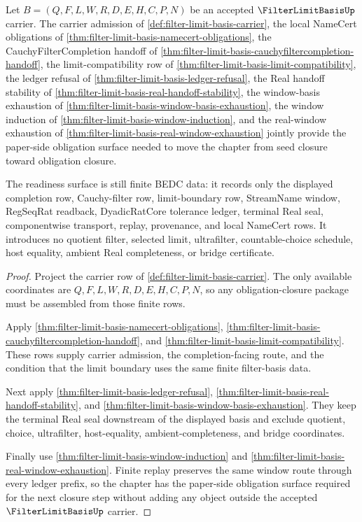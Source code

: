 \begin{theorem}
\label{thm:filter-limit-basis-obligation-closure-readiness}
Let $B=(Q,F,L,W,R,D,E,H,C,P,N)$ be an accepted $\FilterLimitBasisUp$ carrier. The carrier admission of \autoref{def:filter-limit-basis-carrier}, the local NameCert obligations of \autoref{thm:filter-limit-basis-namecert-obligations}, the CauchyFilterCompletion handoff of \autoref{thm:filter-limit-basis-cauchyfiltercompletion-handoff}, the limit-compatibility row of \autoref{thm:filter-limit-basis-limit-compatibility}, the ledger refusal of \autoref{thm:filter-limit-basis-ledger-refusal}, the Real handoff stability of \autoref{thm:filter-limit-basis-real-handoff-stability}, the window-basis exhaustion of \autoref{thm:filter-limit-basis-window-basis-exhaustion}, the window induction of \autoref{thm:filter-limit-basis-window-induction}, and the real-window exhaustion of \autoref{thm:filter-limit-basis-real-window-exhaustion} jointly provide the paper-side obligation surface needed to move the chapter from seed closure toward obligation closure.

The readiness surface is still finite BEDC data: it records only the displayed completion row, Cauchy-filter row, limit-boundary row, StreamName window, RegSeqRat readback, DyadicRatCore tolerance ledger, terminal Real seal, componentwise transport, replay, provenance, and local NameCert rows. It introduces no quotient filter, selected limit, ultrafilter, countable-choice schedule, host equality, ambient Real completeness, or bridge certificate.
\end{theorem}
\begin{proof}
Project the carrier row of \autoref{def:filter-limit-basis-carrier}. The only available coordinates are $Q,F,L,W,R,D,E,H,C,P,N$, so any obligation-closure package must be assembled from those finite rows.

Apply \autoref{thm:filter-limit-basis-namecert-obligations}, \autoref{thm:filter-limit-basis-cauchyfiltercompletion-handoff}, and \autoref{thm:filter-limit-basis-limit-compatibility}. These rows supply carrier admission, the completion-facing route, and the condition that the limit boundary uses the same finite filter-basis data.

Next apply \autoref{thm:filter-limit-basis-ledger-refusal}, \autoref{thm:filter-limit-basis-real-handoff-stability}, and \autoref{thm:filter-limit-basis-window-basis-exhaustion}. They keep the terminal Real seal downstream of the displayed basis and exclude quotient, choice, ultrafilter, host-equality, ambient-completeness, and bridge coordinates.

Finally use \autoref{thm:filter-limit-basis-window-induction} and \autoref{thm:filter-limit-basis-real-window-exhaustion}. Finite replay preserves the same window route through every ledger prefix, so the chapter has the paper-side obligation surface required for the next closure step without adding any object outside the accepted $\FilterLimitBasisUp$ carrier.
\end{proof}

